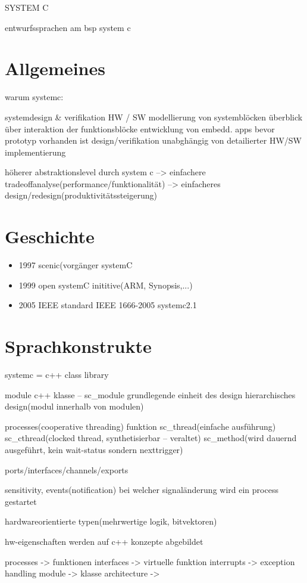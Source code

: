 
SYSTEM C

				entwurfssprachen am bsp system c

\section{Allgemeines}
	warum systemc:

	systemdesign \& verifikation HW / SW
	modellierung von systemblöcken
	überblick über interaktion der funktionsblöcke
	entwicklung von embedd. apps bevor prototyp vorhanden ist
	design/verifikation unabghängig von detailierter HW/SW implementierung

	höherer abstraktionslevel durch system c
		--> einfachere tradeoffanalyse(performance/funktionalität)
		--> einfacheres design/redesign(produktivitätssteigerung)

\section{Geschichte}
\begin{itemize}
 \item 1997 scenic(vorgänger systemC
 \item 1999 open systemC inititive(ARM, Synopsis,...)
 \item 2005 IEEE standard IEEE 1666-2005 systemc2.1
\end{itemize}

	
\section{Sprachkonstrukte}
	systemc = c++ class library
	
	module
		c++ klasse – sc\_module
		grundlegende einheit des design
		hierarchisches design(modul innerhalb von modulen)

	processes(cooperative threading)
funktion
sc\_thread(einfache ausführung)
sc\_cthread(clocked thread, synthetisierbar – veraltet)
sc\_method(wird dauernd ausgeführt, kein wait-status sondern nexttrigger)

	ports/interfaces/channels/exports

	sensitivity, events(notification)
		bei welcher signaländerung wird ein process gestartet

	hardwareorientierte typen(mehrwertige logik, bitvektoren)

	hw-eigenschaften werden auf c++ konzepte abgebildet
	
	processes -> funktionen
	interfaces -> virtuelle funktion
	interrupts -> exception handling
	module -> klasse
	architecture -> 

